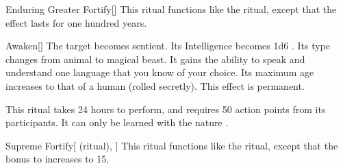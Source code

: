 \lowercase{\hypertarget{spell:Enduring Greater Fortify}{}}\label{spell:Enduring Greater Fortify}
\begin{apability}[Rank 5]{\hypertarget{spell:Enduring Greater Fortify}{Enduring Greater Fortify}}[]
This ritual functions like the  ritual, except that the effect lasts for one hundred years.
\end{apability}
\vspace{0.25em}



\lowercase{\hypertarget{spell:Awaken}{}}\label{spell:Awaken}
\begin{apability}[Rank 6]{\hypertarget{spell:Awaken}{Awaken}}[]
The target becomes sentient.
Its Intelligence becomes 1d6 .
Its type changes from animal to magical beast.
It gains the ability to speak and understand one language that you know of your choice.
Its maximum age increases to that of a human (rolled secretly).
This effect is permanent.

This ritual takes 24 hours to perform, and requires 50 action points from its participants.
It can only be learned with the nature .
\end{apability}
\vspace{0.25em}



\lowercase{\hypertarget{spell:Supreme Fortify}{}}\label{spell:Supreme Fortify}
\begin{attuneability}[Rank 7]{\hypertarget{spell:Supreme Fortify}{Supreme Fortify}}[ (ritual), ]
This ritual functions like the  ritual, except that the bonus to  increases to 15.
\end{attuneability}
\vspace{0.25em}


